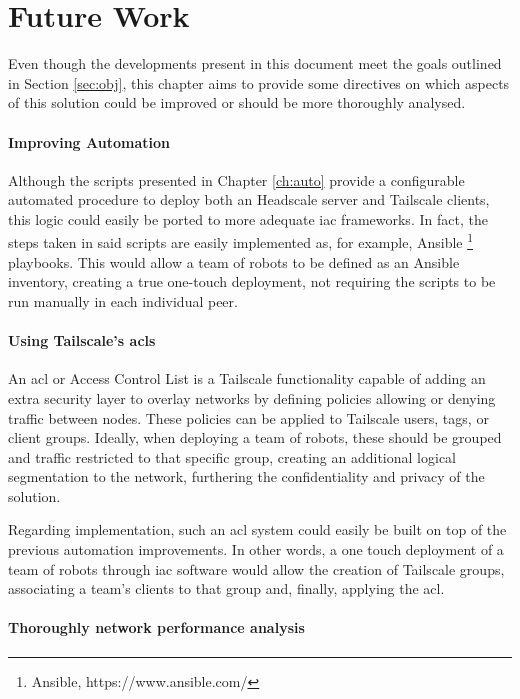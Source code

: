 \documentclass[11pt,twoside,a4paper]{report}
\begin{document}
\chapter{Future Work}

Even though the developments present in this document meet the goals outlined in Section \ref{sec:obj}, this chapter aims to provide some directives on which aspects of this solution could be improved or should be more thoroughly analysed.

\subsubsection{Improving Automation}

Although the scripts presented in Chapter \ref{ch:auto} provide a configurable automated procedure to deploy both an Headscale server and Tailscale clients, this logic could easily be ported to more adequate \ac{iac} frameworks. In fact, the steps taken in said scripts are easily implemented as, for example, Ansible \footnote{Ansible, https://www.ansible.com/} playbooks. This would allow a team of robots to be defined as an Ansible inventory, creating a true one-touch deployment, not requiring the scripts to be run manually in each individual peer.

\subsubsection{Using Tailscale's \acp{acl}}

An \ac{acl} or Access Control List is a Tailscale functionality capable of adding an extra security layer to overlay networks by defining policies allowing or denying traffic between nodes. These policies can be applied to Tailscale users, tags, or client groups. Ideally, when deploying a team of robots, these should be grouped and traffic restricted to that specific group, creating an additional logical segmentation to the network, furthering the confidentiality and privacy of the solution.

Regarding implementation, such an \ac{acl} system could easily be built on top of the previous automation improvements. In other words, a one touch deployment of a team of robots through \ac{iac} software would allow the creation of Tailscale groups, associating a team's clients to that group and, finally, applying the \ac{acl}.

\subsubsection{Thoroughly network performance analysis}
\end{document}
